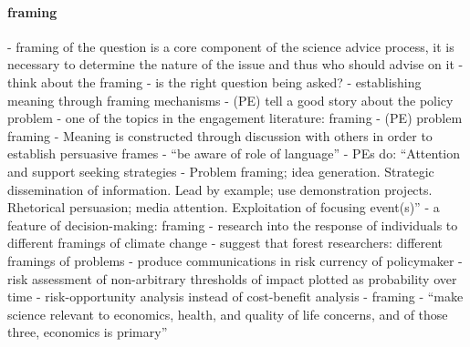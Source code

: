 \paragraph{framing}
\cite[p18]{OECD2015} - framing of the question is a core component of the science advice process, it is necessary to determine the nature of the issue and thus who should advise on it
\cite{GluckmanBK2021} - think about the framing - is the right question being asked?
\cite{AukesLB2018} - establishing meaning through framing mechanisms
\cite{Cairney2018} - (PE) tell a good story about the policy problem
\cite{CairneyO2020} - one of the topics in the engagement literature: framing
\cite{Mintrom2019} - (PE) problem framing - Meaning is constructed through discussion with others in order to establish persuasive frames
\cite{ElsensohnACDGGKPRS2019} - ``be aware of role of language''
\cite{vonMalmborg2024strategies} - PEs do: ``Attention and support seeking strategies - Problem framing; idea generation. Strategic dissemination of information. Lead by example; use demonstration projects. Rhetorical persuasion; media attention. Exploitation of focusing event(s)''
\cite{MoallemiZHSMZHKHMGLB2023} - a feature of decision-making: framing
\cite{NabiGJ2018} - research into the response of individuals to different framings of climate change
\cite{OjanenBKP2021} - suggest that forest researchers: different framings of problems
\cite{DeMeyer2019} - produce communications in risk currency of policymaker
\cite{Sharpe2019} - risk assessment of non-arbitrary thresholds of impact plotted as probability over time
\cite{SharpeMVIGPKN2021} - risk-opportunity analysis instead of cost-benefit analysis
\cite{ThompsonD2024} - framing
\cite{RykielEtAl2002} - ``make science relevant to economics, health, and quality of life concerns, and of those three, economics is primary''

